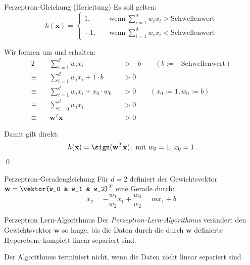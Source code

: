\begin{bonus}{Perzeptron-Gleichung (Herleitung)}
    Es soll gelten:
    \[
        h(\mathbf{x}) =
        \begin{cases}
            1, \quad  & \text{wenn} \ \displaystyle \sum_{i=1}^d w_i x_i > \text{Schwellenwert} \\
            -1, \quad & \text{wenn} \ \displaystyle \sum_{i=1}^d w_i x_i < \text{Schwellenwert}
        \end{cases}
    \]

    Wir formen um und erhalten:
    \begin{alignat*}{2}
                     & \sum_{i=1}^d w_i x_i                 &  & > -b \qquad (b := -\text{Schwellenwert}) \\
        \equiv \quad & \sum_{i=1}^d w_i x_i + 1 \cdot b     &  & > 0                                      \\
        \equiv \quad & \sum_{i=1}^d w_i x_i + x_0 \cdot w_0 &  & > 0 \qquad (x_0 := 1, w_0 := b)          \\
        \equiv \quad & \sum_{i=0}^d w_i x_i                 &  & > 0                                      \\
        \equiv \quad & \mathbf{w}^T \mathbf{x}              &  & > 0
    \end{alignat*}

    Damit gilt direkt:
    \[
        h(\mathbf{x}) = \sign(\mathbf{w}^T\mathbf{x}), \ \text{mit} \ w_0 = 1, \, x_0 = 1
    \]
    \qed
\end{bonus}

\begin{bonus}{Perzeptron-Geradengleichung}
    Für $d = 2$ definiert der Gewichtsvektor $\mathbf{w} = \vektor{w_0 & w_1 & w_2}^T$ eine Gerade durch:
    \[
        x_2 = - \frac{w_1}{w_2} x_1 + \frac{w_0}{w_2} = m x_1 + b
    \]
\end{bonus}

\begin{defi}{Perzeptron Lern-Algorithmus}
    Der \emph{Perzeptron-Lern-Algorithmus} verändert den Gewichtsvektor $\mathbf{w}$ so lange, bis die Daten durch die durch $\mathbf{w}$ definierte Hyperebene komplett linear separiert sind.

    Der Algorithmus terminiert nicht, wenn die Daten nicht linear separiert sind.
\end{defi}

